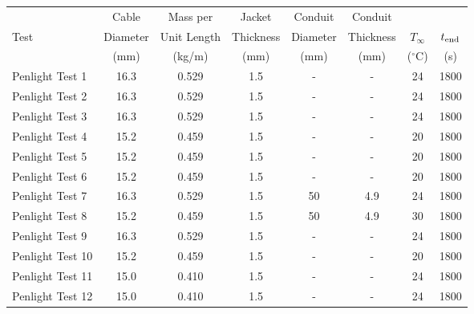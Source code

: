 \begin{table}[!ht]
\begin{center}
\begin{tabular}{|l|c|c|c|c|c|c|c|}
\hline
                  &  Cable     &  Mass per     &  Jacket     &  Conduit   &  Conduit    &               &               \\
Test              &  Diameter  &  Unit Length  &  Thickness  &  Diameter  &  Thickness  &  $T_\infty$   &  $t\sb{end}$  \\
                  &  (mm)      &  (kg/m)       &  (mm)       &  (mm)      &  (mm)       &  ($^\circ$C)  &  (s)          \\ \hline \hline
Penlight Test 1   &  16.3      &  0.529        &  1.5        &  -         &  -          &  24           &  1800         \\ \hline
Penlight Test 2   &  16.3      &  0.529        &  1.5        &  -         &  -          &  24           &  1800         \\ \hline
Penlight Test 3   &  16.3      &  0.529        &  1.5        &  -         &  -          &  24           &  1800         \\ \hline
Penlight Test 4   &  15.2      &  0.459        &  1.5        &  -         &  -          &  20           &  1800         \\ \hline
Penlight Test 5   &  15.2      &  0.459        &  1.5        &  -         &  -          &  20           &  1800         \\ \hline
Penlight Test 6   &  15.2      &  0.459        &  1.5        &  -         &  -          &  20           &  1800         \\ \hline
Penlight Test 7   &  16.3      &  0.529        &  1.5        &  50        &  4.9        &  24           &  1800         \\ \hline
Penlight Test 8   &  15.2      &  0.459        &  1.5        &  50        &  4.9        &  30           &  1800         \\ \hline
Penlight Test 9   &  16.3      &  0.529        &  1.5        &  -         &  -          &  24           &  1800         \\ \hline
Penlight Test 10  &  15.2      &  0.459        &  1.5        &  -         &  -          &  20           &  1800         \\ \hline
Penlight Test 11  &  15.0      &  0.410        &  1.5        &  -         &  -          &  24           &  1800         \\ \hline
Penlight Test 12  &  15.0      &  0.410        &  1.5        &  -         &  -          &  24           &  1800         \\ \hline

\end{tabular}
\end{center}
\end{table}
